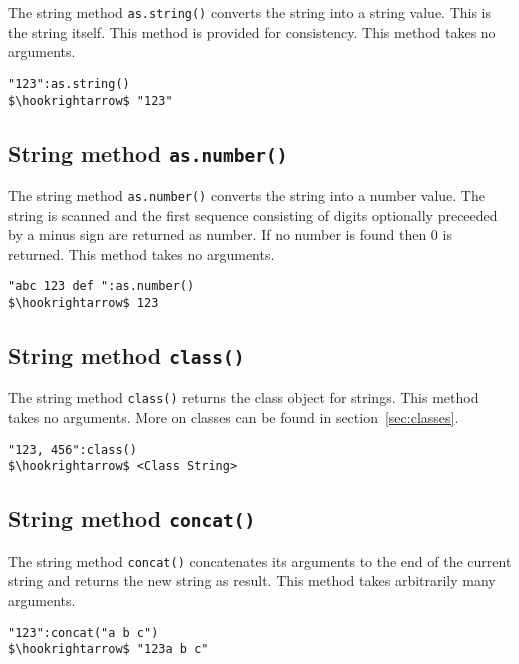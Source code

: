 \documentclass[11pt,a4paper]{scrbook}
\begin{document}
The string method \texttt{as.string()} converts the string into a string
value. This is the string itself. This method is provided for consistency.
This method takes no arguments.

\begin{lstlisting}[language=BibTool,mathescape=true]
"123":as.string()
$\hookrightarrow$ "123"
\end{lstlisting}

\subsection{String method \texttt{as.number()}}

The string method \texttt{as.number()} converts the string into a number
value. The string is scanned and the first sequence consisting of digits
optionally preceeded by a minus sign are returned as number. If no number is
found then 0 is returned. This method takes no arguments.

\begin{lstlisting}[language=BibTool,mathescape=true]
"abc 123 def ":as.number()
$\hookrightarrow$ 123
\end{lstlisting}

\subsection{String method \texttt{class()}}

The string method \texttt{class()} returns the class object for strings. This
method takes no arguments. More on classes can be found in
section~\ref{sec:classes}.

\begin{lstlisting}[language=BibTool,mathescape=true]
"123, 456":class()
$\hookrightarrow$ <Class String>
\end{lstlisting}

\subsection{String method \texttt{concat()}}

The string method \texttt{concat()} concatenates its arguments to the end of
the current string and returns the new string as result.
This method takes arbitrarily many arguments.

\begin{lstlisting}[language=BibTool,mathescape=true]
"123":concat("a b c")
$\hookrightarrow$ "123a b c"
\end{lstlisting}
\end{document}
